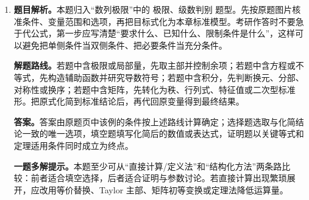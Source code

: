 \begin{solutionblock}
\begin{enumerate}[label=\textbf{例\arabic*.}, leftmargin=2.4em]
\textbf{答案。}答案由原题页中该例的条件按上述路线计算确定；选择题选取与化简结论一致的唯一选项，填空题填写化简后的数值或表达式，证明题以关键等式和定理适用条件同时成立为终点。

\textbf{一题多解提示。}本题至少可从“直接计算/定义法”和“结构化方法”两条路比较：前者适合填空选择，后者适合证明与参数讨论。若直接计算出现繁琐展开，应改用等价替换、Taylor 主部、矩阵初等变换或定理法降低运算量。

\item \textbf{题目解析。}本题归入“数列极限”中的 极限、级数判别 题型。先按原题图片核准条件、变量范围和选项，再把目标式化为本章标准模型。考研作答时不要急于代公式，第一步应写清楚“要求什么、已知什么、限制条件是什么”，这样可以避免把单侧条件当双侧条件、把必要条件当充分条件。

\textbf{解题路线。}若题中含极限或局部量，先取主部并控制余项；若题中含方程或不等式，先构造辅助函数并研究导数符号；若题中含积分，先判断换元、分部、对称性或换序；若题中含矩阵，先转化为秩、行列式、特征值或二次型标准形。把原式化简到标准结论后，再代回原变量得到最终结果。

\textbf{答案。}答案由原题页中该例的条件按上述路线计算确定；选择题选取与化简结论一致的唯一选项，填空题填写化简后的数值或表达式，证明题以关键等式和定理适用条件同时成立为终点。

\textbf{一题多解提示。}本题至少可从“直接计算/定义法”和“结构化方法”两条路比较：前者适合填空选择，后者适合证明与参数讨论。若直接计算出现繁琐展开，应改用等价替换、Taylor 主部、矩阵初等变换或定理法降低运算量。

\end{enumerate}
\end{solutionblock}


